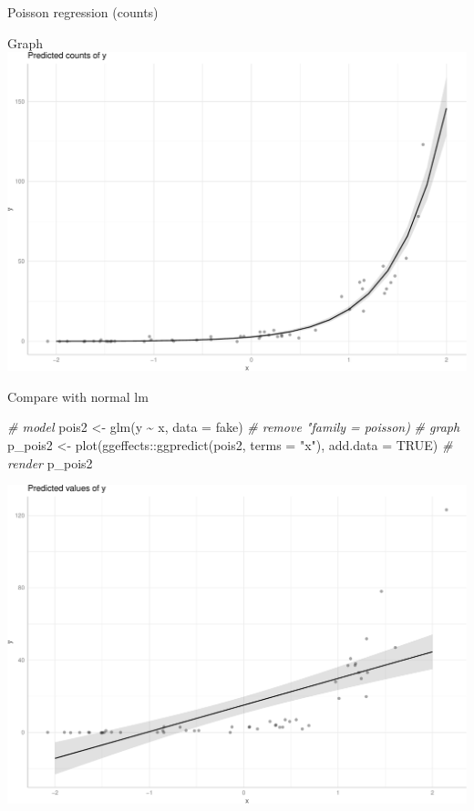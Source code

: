 \documentclass[
  ignorenonframetext,
]{beamer}
\newenvironment{Shaded}{\begin{snugshade}}{\end{snugshade}}
\newcommand{\AttributeTok}[1]{\textcolor[rgb]{0.77,0.63,0.00}{#1}}
\newcommand{\CommentTok}[1]{\textcolor[rgb]{0.56,0.35,0.01}{\textit{#1}}}
\newcommand{\ConstantTok}[1]{\textcolor[rgb]{0.00,0.00,0.00}{#1}}
\newcommand{\FunctionTok}[1]{\textcolor[rgb]{0.00,0.00,0.00}{#1}}
\newcommand{\NormalTok}[1]{#1}
\newcommand{\OtherTok}[1]{\textcolor[rgb]{0.56,0.35,0.01}{#1}}
\newcommand{\SpecialCharTok}[1]{\textcolor[rgb]{0.00,0.00,0.00}{#1}}
\newcommand{\StringTok}[1]{\textcolor[rgb]{0.31,0.60,0.02}{#1}}
\begin{document}
\begin{frame}[fragile]{Poisson regression (counts)}
\begin{block}{Graph}
\protect\hypertarget{graph-2}{}
\includegraphics{slides_files/figure-beamer/unnamed-chunk-35-1.pdf}
\end{block}

\begin{block}{Compare with normal lm}
\protect\hypertarget{compare-with-normal-lm}{}
\begin{Shaded}
\begin{Highlighting}[]
\CommentTok{\# model}
\NormalTok{pois2 }\OtherTok{\textless{}{-}} \FunctionTok{glm}\NormalTok{(y }\SpecialCharTok{\textasciitilde{}}\NormalTok{ x, }\AttributeTok{data =}\NormalTok{ fake) }\CommentTok{\# remove "family = \textasciigrave{}poisson\textasciigrave{})}
\CommentTok{\# graph }
\NormalTok{p\_pois2 }\OtherTok{\textless{}{-}} \FunctionTok{plot}\NormalTok{(ggeffects}\SpecialCharTok{::}\FunctionTok{ggpredict}\NormalTok{(pois2, }\AttributeTok{terms =} \StringTok{"x"}\NormalTok{),}
                \AttributeTok{add.data =} \ConstantTok{TRUE}\NormalTok{)}
\CommentTok{\# render}
\NormalTok{p\_pois2}
\end{Highlighting}
\end{Shaded}

\includegraphics{slides_files/figure-beamer/unnamed-chunk-36-1.pdf}
\end{block}
\end{frame}
\end{document}
